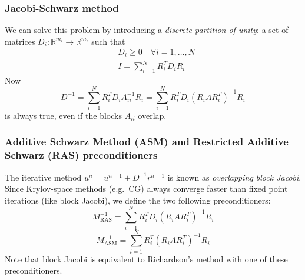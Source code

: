\documentclass{beamer}
\newcommand{\R}{\mathbb{R}}
\begin{document}
\begin{frame}
\frametitle{Jacobi-Schwarz method}
We can solve this problem by introducing a \emph{discrete partition of unity}:
a set of matrices $D_i \colon \R^{m_i} \to \R^{m_i}$ such that
\begin{align*}
&	D_i \geq 0 \quad \forall i = 1,\dots,N \\
&	I = \sum_{i=1}^N R_i^T D_i R_i
\end{align*}
Now
\[
D^{-1}
= \sum_{i=1}^N R_i^T D_i A_{ii}^{-1} R_i
= \sum_{i=1}^N R_i^T D_i (R_i A R_i^T)^{-1} R_i
\]
is always true, even if the blocks $A_{ii}$ overlap.

\end{frame}

%

\begin{frame}
\frametitle{Additive Schwarz Method (ASM)
	and Restricted Additive Schwarz (RAS) preconditioners}
The iterative method $u^n = u^{n-1} + D^{-1} r^{n-1}$
is known as \emph{overlapping block Jacobi}.
Since Krylov-space methods (e.g.\ CG) always converge faster than
fixed point iterations (like block Jacobi),
we define the two following preconditioners:
\[
M_\text{RAS}^{-1} = \sum_{i=1}^N R_i^T D_i (R_i A R_i^T)^{-1} R_i
\]
\[
M_\text{ASM}^{-1} = \sum_{i=1}^N R_i^T (R_i A R_i^T)^{-1} R_i
\]
Note that block Jacobi is equivalent to Richardson's method
with one of these preconditioners.
\end{frame}
\end{document}
